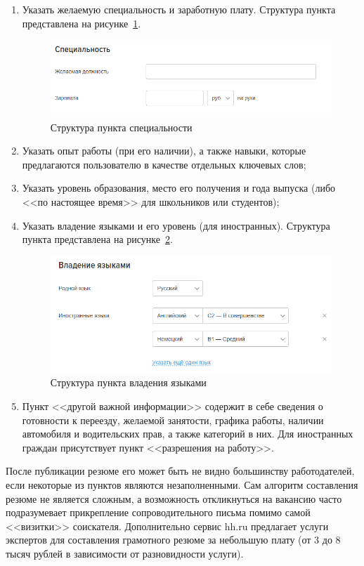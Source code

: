 \documentclass[master, och, diploma]{SCWorks}
\begin{document}
\begin{enumerate}
    \item Указать желаемую специальность и заработную плату. Структура пункта представлена на рисунке~\ref{fig:3}.
        \begin{figure}[!ht]
            \centering
            \includegraphics[width=12cm]{images/image3.png}
            \caption{\label{fig:3}%
                Структура пункта специальности}
        \end{figure}

    \item Указать опыт работы (при его наличии), а также навыки, которые предлагаются пользователю в качестве отдельных ключевых слов;
    \item Указать уровень образования, место его получения и года выпуска (либо <<по настоящее время>> для школьников или студентов);
    \item Указать владение языками и его уровень (для иностранных). Структура пункта представлена на рисунке~\ref{fig:4}.
        \begin{figure}[!ht]
            \centering
            \includegraphics[width=12cm]{images/image1.png}
            \caption{\label{fig:4}%
                Структура пункта владения языками}
        \end{figure}
    \item Пункт <<другой важной информации>> содержит в себе сведения о готовности к переезду, желаемой занятости, графика работы, наличии автомобиля и водительских прав, а также категорий в них. Для иностранных граждан присутствует пункт <<разрешения на работу>>.
\end{enumerate}

После публикации резюме его может быть не видно большинству работодателей, если некоторые из пунктов являются незаполненными. Сам алгоритм составления резюме не является сложным, а возможность откликнуться на вакансию часто подразумевает прикрепление сопроводительного письма помимо самой <<визитки>> соискателя. Дополнительно сервис hh.ru предлагает услуги экспертов для составления грамотного резюме за небольшую плату (от 3 до 8 тысяч рублей в зависимости от разновидности услуги).
\end{document}
